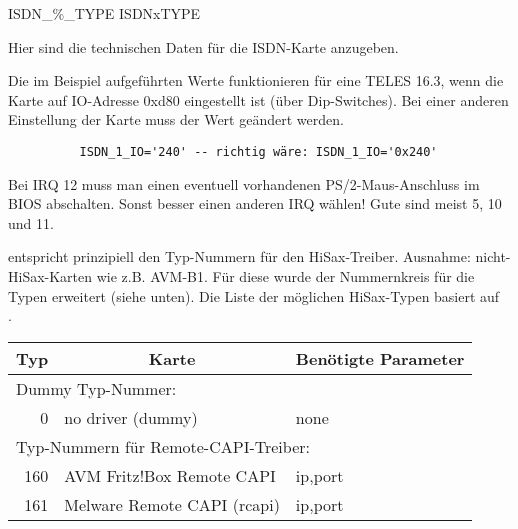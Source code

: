 \begin{description}
 {ISDN\_\%\_TYPE} {ISDNxTYPE}

  Hier sind die technischen Daten für die ISDN-Karte anzugeben.
  
  Die im Beispiel aufgeführten Werte funktionieren für eine TELES
  16.3, wenn die Karte auf IO-Adresse 0xd80 eingestellt ist (über
  Dip-Switches).  Bei einer anderen Einstellung der Karte muss der
  Wert geändert werden.

  \begin{example}
  \begin{verbatim}
          ISDN_1_IO='240' -- richtig wäre: ISDN_1_IO='0x240'
  \end{verbatim}
  \end{example}

  Bei IRQ 12 muss man einen eventuell vorhandenen PS/2-Maus-Anschluss im
  BIOS abschalten. Sonst besser einen anderen IRQ wählen!
  \glqq{}Gute\grqq{} sind meist 5, 10 und 11.
  
   entspricht prinzipiell den Typ-Nummern für den
  HiSax-Treiber. Ausnahme: nicht-HiSax-Karten wie z.B. AVM-B1. Für diese
  wurde der Nummernkreis für die Typen erweitert (siehe unten). Die Liste
  der möglichen HiSax-Typen basiert auf \\
  .

\begin{small}
  \begin{longtable}{|r|p{60mm}|p{62mm}|}
    \hline
    \multicolumn{1}{|c}{\textbf{Typ}} & \multicolumn{1}{|c}{\textbf{Karte}} &
    \multicolumn{1}{|c|}{\textbf{Benötigte Parameter}} \\
    \hline\hline
    \endhead

    \multicolumn{3}{|l|}{Dummy Typ-Nummer:} \\
    \hline
      0 &  no driver (dummy)             & none \\

    \hline\hline
    \multicolumn{3}{|l|}{Typ-Nummern für Remote-CAPI-Treiber:} \\
    \hline

    160 & AVM Fritz!Box Remote CAPI   & ip,port \\
    161 & Melware Remote CAPI (rcapi) & ip,port \\


\end{longtable}
\end{small}
\end{description}
